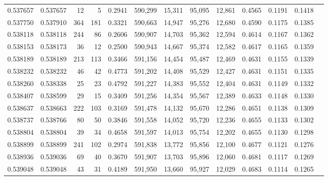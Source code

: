 \begin{tabular}{rrrrrrrrrrrrr}
0.537657 & 0.537657 &    12 &     5 &                                     0.2941 & 590,299 &  15,311 &  95,095 &  12,861 & 0.4565 & 0.1191 & 0.1418 \\
0.537750 & 0.537910 &   364 &   181 &                                     0.3321 & 590,663 &  14,947 &  95,276 &  12,680 & 0.4590 & 0.1175 & 0.1385 \\
0.538118 & 0.538118 &   244 &    86 &                                     0.2606 & 590,907 &  14,703 &  95,362 &  12,594 & 0.4614 & 0.1167 & 0.1362 \\
0.538153 & 0.538173 &    36 &    12 &                                     0.2500 & 590,943 &  14,667 &  95,374 &  12,582 & 0.4617 & 0.1165 & 0.1359 \\
0.538189 & 0.538189 &   213 &   113 &                                     0.3466 & 591,156 &  14,454 &  95,487 &  12,469 & 0.4631 & 0.1155 & 0.1339 \\
0.538232 & 0.538232 &    46 &    42 &                                     0.4773 & 591,202 &  14,408 &  95,529 &  12,427 & 0.4631 & 0.1151 & 0.1335 \\
0.538260 & 0.538338 &    25 &    23 &                                     0.4792 & 591,227 &  14,383 &  95,552 &  12,404 & 0.4631 & 0.1149 & 0.1332 \\
0.538407 & 0.538599 &    29 &    15 &                                     0.3409 & 591,256 &  14,354 &  95,567 &  12,389 & 0.4633 & 0.1148 & 0.1330 \\
0.538637 & 0.538663 &   222 &   103 &                                     0.3169 & 591,478 &  14,132 &  95,670 &  12,286 & 0.4651 & 0.1138 & 0.1309 \\
0.538737 & 0.538766 &    80 &    50 &                                     0.3846 & 591,558 &  14,052 &  95,720 &  12,236 & 0.4655 & 0.1133 & 0.1302 \\
0.538804 & 0.538804 &    39 &    34 &                                     0.4658 & 591,597 &  14,013 &  95,754 &  12,202 & 0.4655 & 0.1130 & 0.1298 \\
0.538899 & 0.538899 &   241 &   102 &                                     0.2974 & 591,838 &  13,772 &  95,856 &  12,100 & 0.4677 & 0.1121 & 0.1276 \\
0.538936 & 0.539036 &    69 &    40 &                                     0.3670 & 591,907 &  13,703 &  95,896 &  12,060 & 0.4681 & 0.1117 & 0.1269 \\
0.539048 & 0.539048 &    43 &    31 &                                     0.4189 & 591,950 &  13,660 &  95,927 &  12,029 & 0.4683 & 0.1114 & 0.1265 \\

\end{tabular}
